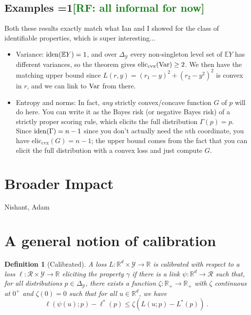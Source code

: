 \documentclass{article}
\newcommand{\Comments}{1}
\newcommand{\mynote}[2]{\ifnum\Comments=1\textcolor{#1}{#2}\fi}
\newcommand{\raf}[1]{\mynote{green}{[RF: #1]}}
\newcommand{\reals}{\mathbb{R}}
\newcommand{\simplex}{\Delta_\Y}
\newcommand{\eliccvx}{\mathrm{elic}_\mathrm{cvx}}
\newcommand{\E}{\mathbb{E}}
\newcommand{\R}{\mathcal{R}}
\newcommand{\Y}{\mathcal{Y}}
\newcommand{\risk}[1]{#1^*}
\newtheorem{definition}{Definition}
\begin{document}
\subsection{Examples \raf{all informal for now}}

Both these results exactly match what Ian and I showed for the class of identifiable properties, which is super interesting...
\begin{itemize}
\item Variance: $\iden(\E Y) = 1$, and over $\simplex$ every non-singleton level set of $\E Y$ has different variances, so the theorem gives $\eliccvx(\Var) \geq 2$.  We then have the matching upper bound since $L(r,y) = (r_1-y)^2 + (r_2-y^2)^2$ is convex in $r$, and we can link to $\mathrm{Var}$ from there.
\item Entropy and norms: In fact, \emph{any} strictly convex/concave function $G$ of $p$ will do here.  You can write it as the Bayes risk (or negative Bayes risk) of a strictly proper scoring rule, which elicits the full distribution $\Gamma(p) = p$.  Since $\mathrm{iden}(\Gamma) = n-1$ since you don't actually need the $n$th coordinate, you have $\eliccvx(G) = n-1$; the upper bound comes from the fact that you can elicit the full distribution with a convex loss and just compute $G$.
\end{itemize}





\newpage

\section*{Broader Impact}

\begin{ack}
Nishant, Adam
\end{ack}




\newpage
\appendix
\section{A general notion of calibration}

\begin{definition}[Calibrated]\label{def:calibrated-general}
	A loss $L:\reals^d \times \Y \to \reals$ is \emph{calibrated} with respect to a loss $\ell : \R \times \Y \to \reals$ eliciting the property $\gamma$ if there is a link $\psi : \reals^d \to \R$ such that, for all distributions $p \in \simplex$, there exists a function $\zeta : \reals_+ \to \reals_+$ with $\zeta$ continuous at $0^+$ and $\zeta(0) = 0$ such that for all $u \in \reals^d$, we have
	\begin{equation}\label{eq:calibrated-general}
	\ell( \psi(u); p) - \risk{\ell}(p)  \leq \zeta \left(  L(u;p) - \risk{L}(p) \right)~.~
	\end{equation}
\end{definition}
\end{document}
